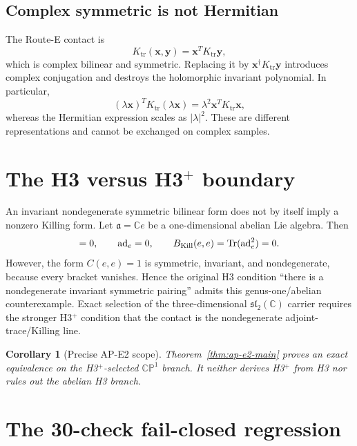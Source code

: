 \documentclass[11pt]{article}
\numberwithin{equation}{section}
\newcommand{\CP}{\mathbb{CP}}
\newcommand{\CC}{\mathbb C}
\newcommand{\sltwo}{\mathfrak{sl}_2(\mathbb C)}
\newcommand{\Ktr}{K_{\mathrm{tr}}}
\newcommand{\Tr}{\operatorname{Tr}}
\newcommand{\ad}{\operatorname{ad}}
\newtheorem{corollary}[theorem]{Corollary}
\begin{document}
\subsection{Complex symmetric is not Hermitian}

The Route-E contact is
\begin{equation}
 \Ktr(\bm x,\bm y)=\bm x^T\Ktr\bm y,
 \label{eq:complex-bilinear}
\end{equation}
which is complex bilinear and symmetric.  Replacing it by
\(\bm x^\dagger\Ktr\bm y\) introduces complex conjugation and destroys the
holomorphic invariant polynomial.  In particular,
\begin{equation}
 (\lambda\bm x)^T\Ktr(\lambda\bm x)
 =\lambda^2\bm x^T\Ktr\bm x,
\end{equation}
whereas the Hermitian expression scales as \(|\lambda|^2\).  These are
different representations and cannot be exchanged on complex samples.

\section{The H3 versus H3\texorpdfstring{$^+$}{+} boundary}

An invariant nondegenerate symmetric bilinear form does not by itself imply a
nonzero Killing form.  Let \(\mathfrak a=\CC e\) be a one-dimensional abelian
Lie algebra.  Then
\begin{equation}
 [e,e]=0,
 \qquad \ad_e=0,
 \qquad B_{\rm Kill}(e,e)=\Tr(\ad_e^2)=0.
 \label{eq:abelian-killing}
\end{equation}
However, the form \(C(e,e)=1\) is symmetric, invariant, and nondegenerate,
because every bracket vanishes.  Hence the original H3 condition ``there is a
nondegenerate invariant symmetric pairing'' admits this genus-one/abelian
counterexample.  Exact selection of the three-dimensional
\(\sltwo\) carrier requires the stronger H3$^+$ condition that the contact is
the nondegenerate adjoint-trace/Killing line.

\begin{corollary}[Precise AP-E2 scope]
Theorem~\ref{thm:ap-e2-main} proves an exact equivalence on the H3$^+$-selected
\(\CP^1\) branch.  It neither derives H3$^+$ from H3 nor rules out the abelian
H3 branch.
\end{corollary}

\section{The 30-check fail-closed regression}
\end{document}
